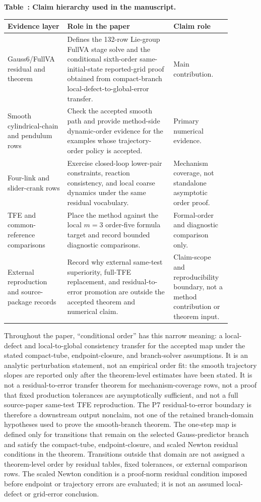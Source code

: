 \documentclass[preprint,12pt]{elsarticle}
\newcommand{\tfe}{TFE}
\begin{document}
\begin{center}
\label{tab:intro-claim-hierarchy}
\small
\textbf{Table~\thetable: Claim hierarchy used in the manuscript.}\par\vspace{0.5em}
\begin{tabular}{P{0.23\linewidth}P{0.43\linewidth}P{0.22\linewidth}}
\toprule
Evidence layer & Role in the paper & Claim role \\
\midrule
Gauss6/FullVA residual and theorem &
Defines the 132-row Lie-group FullVA stage solve and the conditional
sixth-order same-initial-state reported-grid proof obtained from
compact-branch local-defect-to-global-error transfer. &
Main contribution. \\
Smooth cylindrical-chain and pendulum rows &
Check the accepted smooth path and provide method-side dynamic-order evidence
for the examples whose trajectory-order policy is accepted. &
Primary numerical evidence. \\
Four-link and slider-crank rows &
Exercise closed-loop lower-pair constraints, reaction consistency, and local
coarse dynamics under the same residual vocabulary. &
Mechanism coverage, not standalone asymptotic order proof. \\
\tfe{} and common-reference comparisons &
Place the method against the local \(m=3\) order-five formula target and
record bounded diagnostic comparisons. &
Formal-order and diagnostic comparison only. \\
External reproduction and source-package records &
Record why external same-test superiority, full-\tfe{} replacement, and
residual-to-error promotion are outside the accepted theorem and numerical
claim. &
Claim-scope and reproducibility boundary, not a method contribution or theorem
input. \\
\bottomrule
\end{tabular}
\end{center}

Throughout the paper, ``conditional order'' has this narrow meaning: a
local-defect and local-to-global consistency transfer for the accepted map
under the stated compact-tube, endpoint-closure, and branch-solver
assumptions. It is
an analytic perturbation statement, not an empirical order fit: the smooth
trajectory slopes are reported only after the theorem-level estimates have
been stated. It is not a residual-to-error transfer theorem for mechanism-coverage
rows, not a proof that fixed production tolerances are asymptotically
sufficient, and not a full source-paper same-test \tfe{} reproduction.
The P7 residual-to-error boundary is therefore a downstream output nonclaim,
not one of the retained branch-domain hypotheses used to prove the
smooth-branch theorem.
The one-step map is defined only for transitions that remain on the selected
Gauss-predictor branch and satisfy the compact-tube, endpoint-closure, and
scaled Newton residual conditions in the theorem. Transitions outside that
domain are not assigned a theorem-level order by residual tables, fixed
tolerances, or external comparison rows.
The scaled Newton condition is a proof-norm residual condition imposed before
endpoint or trajectory errors are evaluated; it is not an assumed
local-defect or grid-error conclusion.
\end{document}

